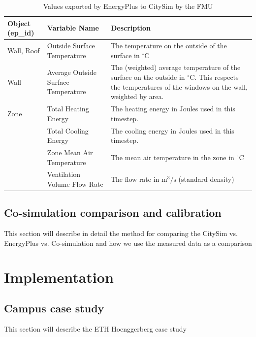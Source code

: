 \documentclass{tBPS2e}
\theoremstyle{plain}
\theoremstyle{definition}
\theoremstyle{remark}
\begin{document}
\begin{table}
\caption{Values exported by EnergyPlus to CitySim by the FMU}
\label{tab:FMUexports}
\centering
\begin{tabular}{|p{1.3cm}|p{1.9cm}|p{3.2cm}|}
  \hline
  \bf{Object (ep\_id)} &  \bf{Variable Name} & \bf{Description} \\
    \hline
Wall, Roof & Outside Surface Temperature & The temperature on the outside of the surface in $^{\circ}\mathrm{C}$ \\    
    \hline
Wall & Average Outside Surface Temperature & The (weighted) average temperature of the surface on the outside in $^{\circ}\mathrm{C}$. This respects the temperatures of the windows on the wall, weighted by area. \\
    \hline
Zone & Total Heating Energy & The heating energy in Joules used in this timestep. \\
    \hline
 & Total Cooling Energy & The cooling energy in Joules used in this timestep. \\
    \hline
 & Zone Mean Air Temperature & The mean air temperature in the zone in $^{\circ}\mathrm{C}$ \\
    \hline
 & Ventilation Volume Flow Rate & The flow rate in $\mathrm{m}^3/\mathrm{s}$ (standard density) \\
    \hline
\end{tabular}
\end{table}

\subsection{Co-simulation comparison and calibration}

{\color{red}This section will describe in detail the method for comparing the CitySim vs. EnergyPlus vs. Co-simulation and how we use the measured data as a comparison}

\section{Implementation}
\subsection{Campus case study}
{\color{red}This section will describe the ETH Hoenggerberg case study}

\end{document}
